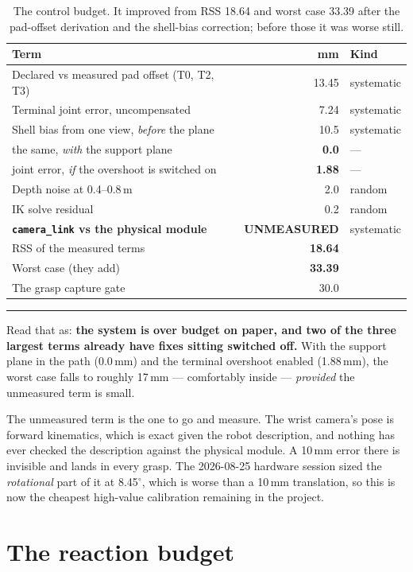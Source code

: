 \documentclass[11pt,a4paper,oneside]{report}
\newcommand{\code}[1]{\texttt{\small #1}}
\newcommand{\dg}{$^{\circ}$}
\newcommand{\keyfact}[1]{%
  \par\vspace{7pt}\noindent
  \hspace*{0pt}\textcolor{srlblue}{\rule{2.5pt}{\dimexpr\baselineskip\relax}}%
  \hspace{9pt}%
  \begin{minipage}[t]{\dimexpr\textwidth-14pt\relax}
  \small #1
  \end{minipage}\par\vspace{7pt}}
\begin{document}
\begin{table}[H]
\centering
\small
\begin{tabular}{@{}lrl@{}}
\toprule
\textbf{Term} & \textbf{mm} & \textbf{Kind} \\
\midrule
Declared vs measured pad offset (T0, T2, T3) & 13.45 & systematic \\
Terminal joint error, uncompensated & 7.24 & systematic \\
Shell bias from one view, \emph{before} the plane & 10.5 & systematic \\
\quad the same, \emph{with} the support plane & \textbf{0.0} & --- \\
\quad joint error, \emph{if} the overshoot is switched on & \textbf{1.88} & --- \\
Depth noise at 0.4--0.8\,m & 2.0 & random \\
IK solve residual & 0.2 & random \\
\textbf{\code{camera\_link} vs the physical module} & \textbf{UNMEASURED} & systematic \\
\midrule
RSS of the measured terms & \textbf{18.64} & \\
Worst case (they add) & \textbf{33.39} & \\
The grasp capture gate & 30.0 & \\
\bottomrule
\end{tabular}
\caption{The control budget. It improved from RSS 18.64 and worst case 33.39
after the pad-offset derivation and the shell-bias correction; before those it
was worse still.}
\end{table}

\keyfact{Read that as: \textbf{the system is over budget on paper, and two of
the three largest terms already have fixes sitting switched off.} With the
support plane in the path (0.0\,mm) and the terminal overshoot enabled
(1.88\,mm), the worst case falls to roughly 17\,mm --- comfortably inside ---
\emph{provided} the unmeasured term is small.}

The unmeasured term is the one to go and measure. The wrist camera's pose is
forward kinematics, which is exact given the robot description, and nothing has
ever checked the description against the physical module. A 10\,mm error there
is invisible and lands in every grasp. The 2026-08-25 hardware session sized
the \emph{rotational} part of it at 8.45\dg, which is worse than a 10\,mm
translation, so this is now the cheapest high-value calibration remaining in
the project.

\section{The reaction budget}
\end{document}
